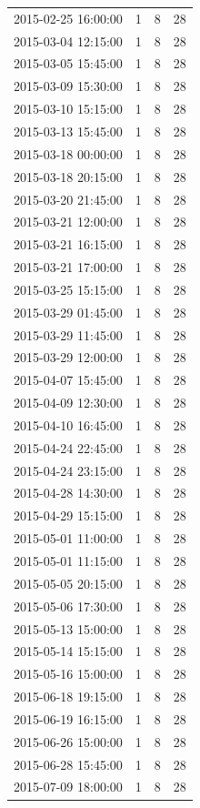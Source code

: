 \begin{tabular}{lrrr}
2015-02-25 16:00:00 & 1 & 8 & 28 \\
2015-03-04 12:15:00 & 1 & 8 & 28 \\
2015-03-05 15:45:00 & 1 & 8 & 28 \\
2015-03-09 15:30:00 & 1 & 8 & 28 \\
2015-03-10 15:15:00 & 1 & 8 & 28 \\
2015-03-13 15:45:00 & 1 & 8 & 28 \\
2015-03-18 00:00:00 & 1 & 8 & 28 \\
2015-03-18 20:15:00 & 1 & 8 & 28 \\
2015-03-20 21:45:00 & 1 & 8 & 28 \\
2015-03-21 12:00:00 & 1 & 8 & 28 \\
2015-03-21 16:15:00 & 1 & 8 & 28 \\
2015-03-21 17:00:00 & 1 & 8 & 28 \\
2015-03-25 15:15:00 & 1 & 8 & 28 \\
2015-03-29 01:45:00 & 1 & 8 & 28 \\
2015-03-29 11:45:00 & 1 & 8 & 28 \\
2015-03-29 12:00:00 & 1 & 8 & 28 \\
2015-04-07 15:45:00 & 1 & 8 & 28 \\
2015-04-09 12:30:00 & 1 & 8 & 28 \\
2015-04-10 16:45:00 & 1 & 8 & 28 \\
2015-04-24 22:45:00 & 1 & 8 & 28 \\
2015-04-24 23:15:00 & 1 & 8 & 28 \\
2015-04-28 14:30:00 & 1 & 8 & 28 \\
2015-04-29 15:15:00 & 1 & 8 & 28 \\
2015-05-01 11:00:00 & 1 & 8 & 28 \\
2015-05-01 11:15:00 & 1 & 8 & 28 \\
2015-05-05 20:15:00 & 1 & 8 & 28 \\
2015-05-06 17:30:00 & 1 & 8 & 28 \\
2015-05-13 15:00:00 & 1 & 8 & 28 \\
2015-05-14 15:15:00 & 1 & 8 & 28 \\
2015-05-16 15:00:00 & 1 & 8 & 28 \\
2015-06-18 19:15:00 & 1 & 8 & 28 \\
2015-06-19 16:15:00 & 1 & 8 & 28 \\
2015-06-26 15:00:00 & 1 & 8 & 28 \\
2015-06-28 15:45:00 & 1 & 8 & 28 \\
2015-07-09 18:00:00 & 1 & 8 & 28 \\

\end{tabular}
